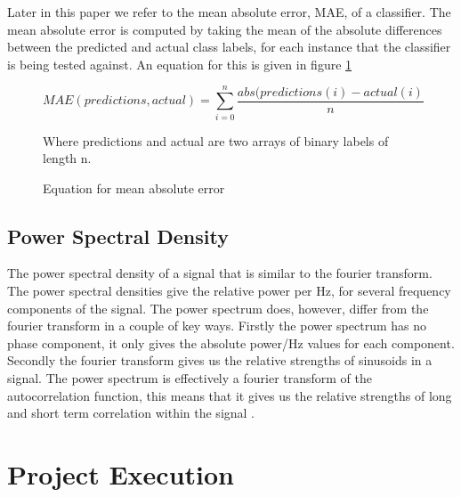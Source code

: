 \documentclass[ %
                    author={Sam Phippen},
                supervisor={Dr. Rafal Bogacz},
                     title={Real time voice activity detectors in noisy personal computing environments},
                  subtitle={},
                    degree={MEng},
                      year={2012} ]{thesis}
\begin{document}
Later in this paper we refer to the mean absolute error, MAE, of a classifier.
The mean absolute error is computed by taking the mean of the absolute
differences between the predicted and actual class labels, for each instance
that the classifier is being tested against. An equation for this is given in
figure \ref{mae-eqn}

\begin{figure}
    \begin{center}
        $$MAE(predictions, actual) = \sum_{i=0}^n\frac{abs(predictions(i)-actual(i)}{n}$$
    \end{center}

    Where predictions and actual are two arrays of binary labels of length n.
    \caption{Equation for mean absolute error}
    \label{mae-eqn}
\end{figure}

\section{Power Spectral Density}

The power spectral density of a signal that is similar to the fourier
transform. The power spectral densities give the relative power per Hz, for
several frequency components of the signal. The power spectrum does, however,
differ from the fourier transform in a couple of key ways. Firstly the power
spectrum has no phase component, it only gives the absolute power/Hz values for
each component. Secondly the fourier transform gives us the relative strengths
of sinusoids in a signal. The power spectrum is effectively a fourier transform
of the autocorrelation function, this means that it gives us the relative
strengths of long and short term correlation within the signal
.\cite{psd}\cite{psd2}



\chapter{Project Execution}
\label{chap:execution}

\vspace{1cm} 
\end{document}

